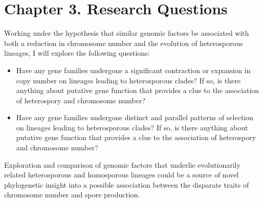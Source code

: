 \chapter{Chapter 3. Research Questions}

Working under the hypothesis that similar genomic factors be associated with both a reduction in chromosome number and the evolution of heterosporous lineages, I will explore the following questions:
\begin{itemize}
	\item Have any gene families undergone a significant contraction or expansion in copy number on lineages leading to heterosporous clades? If so, is there anything about putative gene function that provides a clue to the association of heterospory and chromosome number?
	\item Have any gene families undergone distinct and parallel patterns of selection on lineages leading to heterosporous clades?  If so, is there anything about putative gene function that provides a clue to the association of heterospory and chromosome number?
\end{itemize}

Exploration and comparison of genomic factors that underlie evolutionarily related heterosporous and homosporous lineages could be a source of novel phylogenetic insight into a possible association between the disparate traits of chromosome number and spore production.
